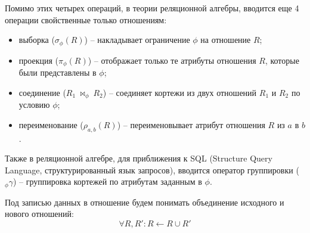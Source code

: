 \indent Помимо этих четырех операций, в теории реляционной алгебры, вводится еще 4 операции свойственные только отношениям\cite{il}:
\begin{itemize}
	\item выборка ($\sigma_\phi(R)$) -- накладывает ограничение $\phi$ на отношение $R$;
	\item проекция ($\pi_\phi(R)$) -- отображает только те атрибуты отношения $R$, которые были представлены в $\phi$;
	\item соединение ($R_1\ \bowtie_\phi\ R_2$) -- соединяет кортежи из двух отношений $R_1$ и $R_2$ по условию $\phi$;
	\item переименование ($\rho_{a,b}(R)$) -- переименовывает атрибут отношения $R$ из $a$ в $b$ .
\end{itemize}

\indent Также в реляционной алгебре, для приближения к SQL (Structure Query Language, структурированный язык запросов), вводится оператор группировки ($_\phi\gamma$) -- группировка кортежей по атрибутам заданным в $\phi$.

\indent Под записью данных в отношение будем понимать объединение исходного и нового отношений:
\begin{equation*}
	\forall R, R': R \leftarrow R \cup R'
\end{equation*}
